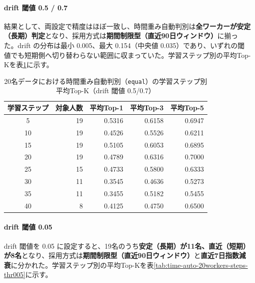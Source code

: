 \paragraph{drift 閾値 0.5 / 0.7}
結果として、両設定で精度はほぼ一致し、時間重み自動判別は\textbf{全ワーカーが安定（長期）判定}となり、採用方式は\textbf{期間制限型（直近90日ウィンドウ）}に揃った。drift の分布は最小 0.005、最大 0.154（中央値 0.035）であり、いずれの閾値でも短期側へ切り替わらない範囲に収まっていた。学習ステップ別の平均Top-Kを表\ref{tab:time-auto-20workers-steps}に示す。

\begin{table}[htbp]
\centering
\caption{20名データにおける時間重み自動判別（\texttt{equal}）の学習ステップ別平均Top-K（drift 閾値 0.5/0.7）}
\label{tab:time-auto-20workers-steps}
\scriptsize
\begin{tabular}{c r r r r}
\hline
学習ステップ & 対象人数 & 平均Top-1 & 平均Top-3 & 平均Top-5 \\
\hline
5  & 19 & 0.5316 & 0.6158 & 0.6947 \\
10 & 19 & 0.4526 & 0.5526 & 0.6211 \\
15 & 19 & 0.5105 & 0.6053 & 0.6895 \\
20 & 19 & 0.4789 & 0.6316 & 0.7000 \\
25 & 15 & 0.4733 & 0.5800 & 0.6333 \\
30 & 11 & 0.3545 & 0.4636 & 0.5273 \\
35 & 11 & 0.3455 & 0.5182 & 0.5455 \\
40 & 8  & 0.4125 & 0.4750 & 0.6500 \\
\hline
\end{tabular}
\end{table}

\paragraph{drift 閾値 0.05}
drift 閾値を 0.05 に設定すると、19名のうち\textbf{安定（長期）が11名、直近（短期）が8名}となり、採用方式は\textbf{期間制限型（直近90日ウィンドウ）}と\textbf{直近7日指数減衰}に分かれた。学習ステップ別の平均Top-Kを表\ref{tab:time-auto-20workers-steps-thr005}に示す。

